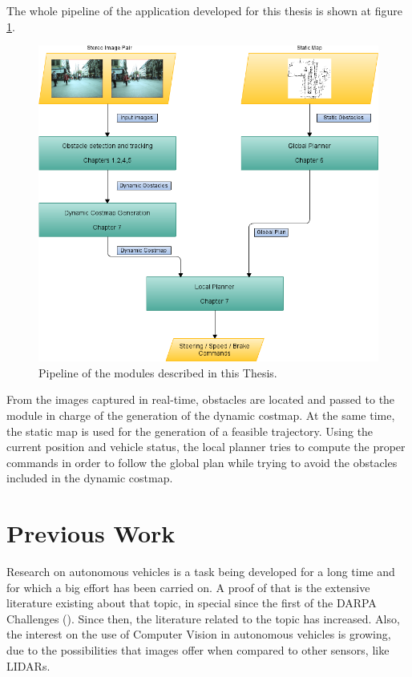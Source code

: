  The whole pipeline of the application developed for this thesis is shown at figure \ref{fig:cp00_pipeline}. 
 
\begin{figure}[thb]\label{fig:cp00_pipeline}
  \centering
  \includegraphics{pipeline}
  \caption{Pipeline of the modules described in this Thesis.}
\end{figure}

From the images captured in real-time, obstacles are located and passed to the module in charge of the generation of the dynamic costmap. At the same time, the static map is used for the generation of a feasible trajectory. Using the current position and vehicle status, the local planner tries to compute the proper commands in order to follow the global plan while trying to avoid the obstacles included in the dynamic costmap.

\section{Previous Work}\label{ch:chapter00_02}

Research on autonomous vehicles is a task being developed for a long time and for which a big effort has been carried on. A proof of that is the extensive literature existing about that topic, in special since the first of the DARPA Challenges (\cite{Buehler2007, Buehler2009}). Since then, the literature related to the topic has increased. Also, the interest on the use of Computer Vision in autonomous vehicles is growing, due to the possibilities that images offer when compared to other sensors, like \acp{LIDAR}.

